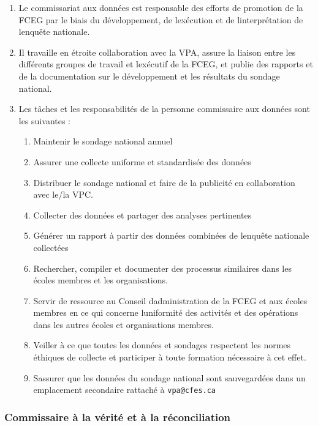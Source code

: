 \begin{enumerate}
 \item
  Le commissariat aux données est responsable des efforts de promotion de la FCEG par le biais du développement, de l\textquotesingle exécution et de l\textquotesingle interprétation de l\textquotesingle enquête nationale.
 \item
  Il travaille en étroite collaboration avec la VPA, assure la liaison entre les différents groupes de travail et l\textquotesingle exécutif de la FCEG, et publie des rapports et de la documentation sur le développement et les résultats du sondage national.
 \item
  Les tâches et les responsabilités de la personne commissaire aux données sont les suivantes :

  \begin{enumerate}
   \item
    Maintenir le sondage national annuel
   \item
    Assurer une collecte uniforme et standardisée des données
   \item
    Distribuer le sondage national et faire de la publicité en collaboration avec le/la VPC.
   \item
    Collecter des données et partager des analyses pertinentes
   \item
    Générer un rapport à partir des données combinées de l\textquotesingle enquête nationale collectées
   \item
    Rechercher, compiler et documenter des processus similaires dans les écoles membres et les organisations.
   \item
    Servir de ressource au Conseil d\textquotesingle administration de la FCEG et aux écoles membres en ce qui concerne l\textquotesingle uniformité des activités et des opérations dans les autres écoles et organisations membres.
   \item
    Veiller à ce que toutes les données et sondages respectent les normes éthiques de collecte et participer à toute formation nécessaire à cet effet.
   \item
    S\textquotesingle assurer que les données du sondage national sont sauvegardées dans un emplacement secondaire rattaché à \texttt{vpa@cfes.ca}
  \end{enumerate}
\end{enumerate}

\subsubsection{Commissaire à la vérité et à la réconciliation}
\label{lela-commissaire-a-la-verite-et-a-la-reconciliation}

